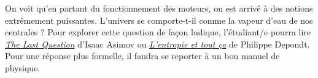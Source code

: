 		On voit qu’en partant du fonctionnement des moteurs, on est arrivé à des notions extrêmement puissantes. L’univers se comporte-t-il comme la vapeur d’eau de nos centrales ? Pour explorer cette question de façon ludique, l’étudiant/e pourra lire \textit{\href{http ://www.multivax.com/last_question.html}{The Last Question}} d’Isaac Asimov ou \textit{\href{http ://www.eyrolles.com/Sciences/Livre/l-entropie-et-tout-ca-9782842250447}{L’entropie et tout ça}} de Philippe Depondt. Pour une réponse plus formelle, il faudra se reporter à un bon manuel de physique.
